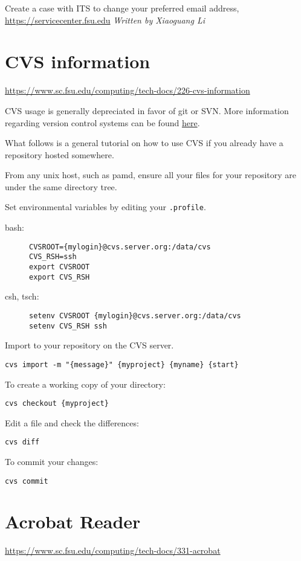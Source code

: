 \documentclass[12pt,a4paper]{article}
\begin{document}
Create a case with ITS to change your preferred email address, \url{https://servicecenter.fsu.edu}
\hfill \textit{Written by Xiaoguang Li}

\section{CVS information}
\url{https://www.sc.fsu.edu/computing/tech-docs/226-cvs-information}

CVS usage is generally depreciated in favor of git or SVN. More information regarding version control systems can be found \href{https://www.sc.fsu.edu/computing/tech-docs/225-svn-information}{here}.

What follows is a general tutorial on how to use CVS if you already have a repository hosted somewhere.

From any unix host, such as pamd, ensure all your files for your repository are under the same directory tree.

Set environmental variables by editing your \texttt{.profile}.
\begin{description}
    \item[bash:]
    \begin{verbatim}
CVSROOT={mylogin}@cvs.server.org:/data/cvs
CVS_RSH=ssh
export CVSROOT
export CVS_RSH
    \end{verbatim}
    \item[csh, tsch:]
    \begin{verbatim}
setenv CVSROOT {mylogin}@cvs.server.org:/data/cvs
setenv CVS_RSH ssh
    \end{verbatim}
\end{description}

Import to your repository on the CVS server.
\begin{verbatim}
cvs import -m "{message}" {myproject} {myname} {start}
\end{verbatim}
To create a working copy of your directory:
\begin{verbatim}
cvs checkout {myproject}
\end{verbatim}
Edit a file and check the differences:
\begin{verbatim}
cvs diff
\end{verbatim}
To commit your changes:
\begin{verbatim}
cvs commit
\end{verbatim}

\section{Acrobat Reader}
\url{https://www.sc.fsu.edu/computing/tech-docs/331-acrobat}
\end{document}
